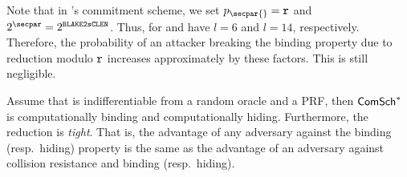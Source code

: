 \begin{remark}\label{instantiation:remark:rbn-blackcomplen}
	Note that in \zeth's commitment scheme, we set $p_\secpar{} = \rCURVE$ and $2^\secpar = 2^\blakeCompLen$. Thus, for \BNCurve and \BLSCurve have $l = 6$ and $l = 14$, respectively. Therefore, the probability of an attacker breaking the binding property due to reduction modulo $\mathtt{r}$ increases approximately by these factors. This is still negligible.
\end{remark}

\begin{cor}
    Assume that  is indifferentiable from a random oracle and a PRF, then $\mathsf{ComSch}^*$ is computationally binding and computationally hiding. Furthermore, the reduction is \emph{tight}. That is, the advantage of any \ppt{} adversary against the binding (resp.~hiding) property is the same as the advantage of an adversary against collision resistance and binding (resp.~hiding).
\end{cor}
